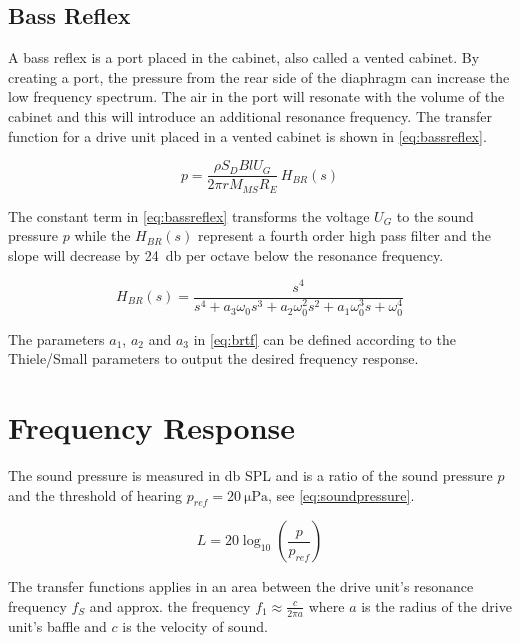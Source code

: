 \subsection{Bass Reflex}
A bass reflex is a port placed in the cabinet, also called a vented cabinet.
By creating a port, the pressure from the rear side of the diaphragm can increase the low frequency spectrum.
The air in the port will resonate with the volume of the cabinet and this will introduce an additional resonance frequency. \cite[p.~53]{Elektroakustik}
The transfer function for a drive unit placed in a vented cabinet is shown in \cref{eq:bassreflex}.

\begin{equation}
p = \frac{\rho S_D B l U_G}{2\pi r M_{MS} R_E}\,H_{BR}(s)
\label{eq:bassreflex}
\end{equation}

The constant term in \cref{eq:bassreflex} transforms the voltage $U_G$ to the sound pressure $p$ while the $H_{BR}(s)$ represent a fourth order high pass filter and the slope will decrease by \SI{24}{\decibel} per octave below the resonance frequency.

\begin{equation}
H_{BR}(s) = \frac{s^4}{s^4+a_3\omega_0s^3+a_2\omega_0^2s^2+a_1\omega_0^3s+\omega_0^4}
\label{eq:brtf}
\end{equation}

The parameters $a_1$, $a_2$ and $a_3$ in \cref{eq:brtf} can be defined according to the Thiele/Small parameters to output the desired frequency response. \cite[p.~55]{Elektroakustik}

\section{Frequency Response}
The sound pressure is measured in \si{\decibel} SPL and is a ratio of the sound pressure $p$ and the threshold of hearing $p_{ref}=\SI{20}{\micro\pascal}$, see \cref{eq:soundpressure}.

\begin{equation}
L=20\log_{10}\left(\frac{p}{p_{ref}}\right)
\label{eq:soundpressure}
\end{equation}

The transfer functions applies in an area between the drive unit's resonance frequency $f_S$ and approx. the frequency $f_1\approx\frac{c}{2\pi a}$ where $a$ is the radius of the drive unit's baffle and $c$ is the velocity of sound. \cite[p.~41]{Elektroakustik}



\FloatBarrier
